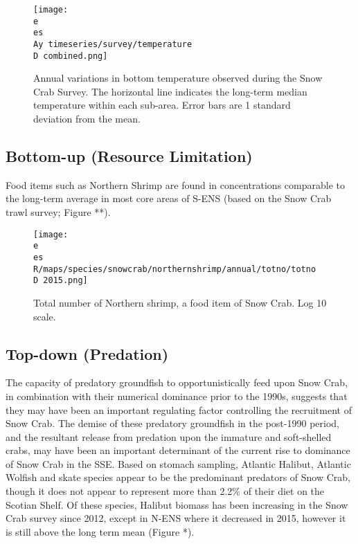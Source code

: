 \documentclass[paper=a4, fontsize=11pt]{article}
\newcommand{\D}{.}
\newcommand{\e}{\string~/ecomod_data/}
\newcommand{\es}{snowcrab/}
\newcommand{\Ay}{assessments/2015/}
\begin{document}
\begin{figure}[h]
    \centering
    \texttt{[image: \\e \\es \\Ay timeseries/survey/temperature\\D combined.png]}
    \caption{Annual variations in bottom temperature observed during the Snow Crab Survey. The horizontal line indicates the long-term median temperature within each sub-area. Error bars are 1 standard deviation from the mean.}
\end{figure}


\subsection{Bottom-up (Resource Limitation)}

Food items such as Northern Shrimp are found in concentrations comparable to the long-term average in most core areas of S-ENS (based on the Snow Crab trawl survey; Figure **).

\begin{figure}[h]
  \centering
     \texttt{[image: \\e \\es R/maps/species/snowcrab/northernshrimp/annual/totno/totno\\D 2015.png]}
    \caption{Total number of Northern shrimp, a food item of Snow Crab. Log 10 scale.}
\end{figure}

\subsection{Top-down (Predation)}
The capacity of predatory groundfish to opportunistically feed upon Snow Crab, in combination with their numerical dominance prior to the 1990s, suggests that they may have been an important regulating factor controlling the recruitment of Snow Crab. The demise of these predatory groundfish in the post-1990 period, and the resultant release from predation upon the immature and soft-shelled crabs, may have been an important determinant of the current rise to dominance of Snow Crab in the SSE. Based on stomach sampling, Atlantic Halibut, Atlantic Wolfish and skate species appear to be the predominant predators of Snow Crab, though it does not appear to represent more than 2.2\% of their diet on the Scotian Shelf. Of these species, Halibut biomass has been increasing in the Snow Crab survey since 2012, except in N-ENS where it decreased in 2015, however it is still above the long term mean (Figure *). 
\end{document}
